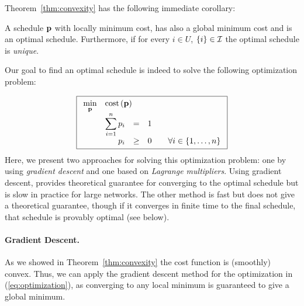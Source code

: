 Theorem~\ref{thm:convexity} has the following immediate corollary:
\begin{corollary}
 A schedule $\mathbf{p}$ with locally minimum cost, has also a global minimum cost and is an optimal schedule. Furthermore, if for every $i\in U$, $\left\{i\right\}\in \mathcal{I}$ the optimal schedule is \emph{unique}.
\end{corollary}

Our goal to find an optimal schedule is indeed to solve the following optimization problem:

\begin{equation}\label{eq:optimization}
\boxed{
\begin{array}{rrclcl}
\displaystyle \min_{\p} & \multicolumn{3}{l}{\cost{\p}} \\
&\displaystyle \sum_{i=1}^{n} p_i & = & 1 \\
&p_i & \geq & 0 & & \forall i \in \set{1,\ldots,n} \\
\end{array} }
\end{equation}
Here, we present two approaches for solving this optimization problem: one by using \emph{gradient descent} and one based on \emph{Lagrange multipliers}. Using gradient descent, provides theoretical guarantee for converging to the optimal schedule but is slow in practice for large networks. The other method is fast but does not give a theoretical guarantee, though if it converges in finite time to the final schedule, that schedule is provably optimal (see below).





\paragraph{\bf Gradient Descent.} As we showed in Theorem~\ref{thm:convexity} the cost function is  (smoothly) convex. Thus, we can apply the gradient descent method for the optimization in (\ref{eq:optimization}), as converging to any local minimum is guaranteed to give a global minimum.

